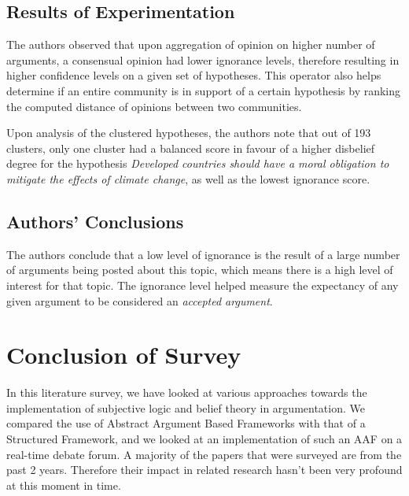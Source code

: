 \documentclass[UTF8]{article}
\begin{document}
\subsection{Results of Experimentation}
The authors observed that upon aggregation of opinion on higher number of arguments, a consensual opinion had 
lower ignorance levels, therefore resulting in higher confidence levels on a given set of hypotheses. This operator also helps determine if 
an entire community is in support of a certain hypothesis by ranking the computed distance of opinions between two communities.

Upon analysis of the clustered hypotheses, the authors note that out of 193 clusters, only one cluster had a balanced score in favour of a higher disbelief degree for the hypothesis
 \textit{Developed countries should have a moral obligation to mitigate the effects of climate change}, as well as the lowest ignorance score.

\subsection{Authors' Conclusions}
The authors conclude that a low level of ignorance is the result of a large number of arguments being posted about this topic, which means there is a high level of interest for that topic. 
The ignorance level helped measure the expectancy of any given argument to be considered an \textit{accepted argument}. 

\section{Conclusion of Survey}
In this literature survey, we have looked at various approaches towards the implementation of subjective logic and belief theory in argumentation. We compared the use of Abstract Argument Based Frameworks with that of a Structured Framework, and we looked at an implementation of such an AAF on a real-time debate forum. A majority of the papers that were surveyed are from the past 2 years. 
Therefore their impact in related research hasn't been very profound at this moment in time.
{}

\end{document}
